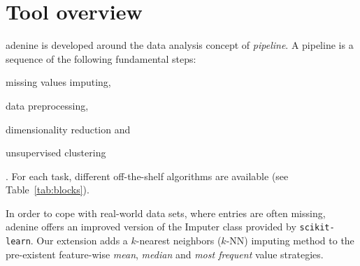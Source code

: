 \documentclass[twoside,11pt]{article}
\makeatletter
\newcommand{\ade}{{\sc adenine}\@\xspace}
\makeatother
\begin{document}
\section{Tool overview}\label{sec:implem}
\ade is developed around the data analysis concept of \emph{pipeline}. A pipeline is a sequence of the following fundamental steps:
\begin{enumerate*}[label=(\roman*)]
  \item missing values imputing,
  \item data preprocessing,
  \item dimensionality reduction and
  \item unsupervised clustering
\end{enumerate*}.
For each task, different off-the-shelf algorithms are available (see Table~\ref{tab:blocks}).%

  In order to cope with real-world data sets, where entries are often missing, \ade offers an improved version of the Imputer class provided by \texttt{scikit-learn}. Our extension adds a $k$-nearest neighbors ($k$-NN) imputing method \citep{troyanskaya2001missing} to the pre-existent feature-wise \emph{mean}, \emph{median} and \emph{most frequent} value strategies.
\end{document}
